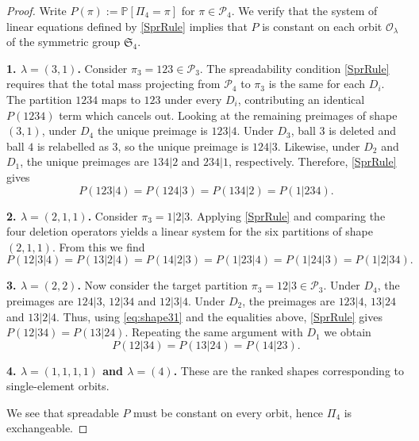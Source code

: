 \documentclass[10pt,a4paper]{amsart}
\begin{document}
\begin{proof}
Write $P(\pi):=\mathbb P[\Pi_4=\pi]$ for $\pi\in\mathcal P_4$. We verify
that the system of linear equations defined by \eqref{SprRule} implies that
$P$ is constant on each orbit ${\mathcal O}_\lambda$
of the symmetric group $\mathfrak S_4$.


{\bf 1. $\lambda=(3,1)$.} Consider $\pi_3=123\in\mathcal P_3$. The spreadability
condition \eqref{SprRule} requires that the total  mass projecting from $\mathcal P_4$
to $\pi_3$ is the same for each $D_i$. The partition $1234$ 
maps to $123$ under every $D_i$, contributing an identical $P(1234)$ term which cancels 
out. Looking at the remaining preimages of shape $(3,1)$, 
under $D_4$ the unique preimage is $123|4$. Under $D_3$, ball $3$
is deleted and ball $4$ is relabelled as $3$, so the unique preimage is
$124|3$. Likewise, under $D_2$ and $D_1$, the unique preimages are $134|2$
and $234|1$, respectively. Therefore,  \eqref{SprRule} gives
\begin{equation}\label{eq:shape31}
P(123|4)
=
P(124|3)
=
P(134|2)
=
P(1|234).
\end{equation}




{\bf 2.  $\lambda=(2,1,1)$.}
Consider  $\pi_3=1|2|3$. Applying
\eqref{SprRule} and comparing the four deletion operators yields a linear
system for the six partitions of shape $(2,1,1)$. From this we find 
\[
P(12|3|4)
=
P(13|2|4)
=
P(14|2|3)
=
P(1|23|4)
=
P(1|24|3)
=
P(1|2|34).
\]


{\bf 3. $\lambda=(2,2)$.}
Now consider the target partition $\pi_3=12|3\in\mathcal P_3$. Under $D_4$,
the preimages are $124|3$, $12|34$ and $12|3|4$. Under $D_2$, the preimages are
$123|4$, $13|24$ and $13|2|4$. Thus, using \eqref{eq:shape31} and the equalities above, \eqref{SprRule} gives
$P(12|34)=P(13|24).$
Repeating the same argument with $D_1$ we
obtain
\[
P(12|34)
=
P(13|24)
=
P(14|23).
\]

{\bf 4. $\lambda=(1,1,1,1)$ and $\lambda=(4)$.} These are the  ranked shapes corresponding to single-element orbits.


We see that spreadable $P$ must be constant on every orbit, hence $\Pi_4$ is exchangeable.
\end{proof}
\end{document}
